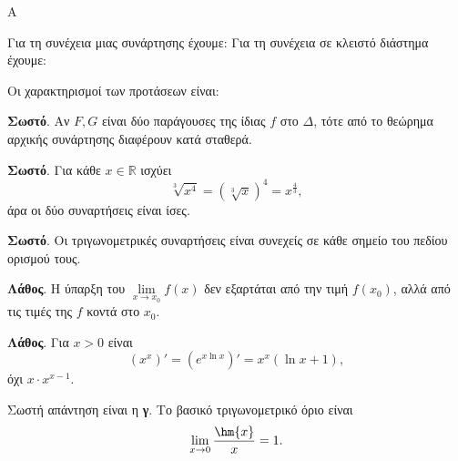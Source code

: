 \begin{thema}{Α}
\begin{erwthma}
\item {}

\item Για τη συνέχεια μιας συνάρτησης έχουμε:
Για τη συνέχεια σε κλειστό διάστημα έχουμε:

\item {}

\item Οι χαρακτηρισμοί των προτάσεων είναι:
\begin{alist}
\item \textbf{Σωστό}. Αν $F,G$ είναι δύο παράγουσες της ίδιας $f$ στο $\Delta$, τότε από το θεώρημα αρχικής συνάρτησης διαφέρουν κατά σταθερά.
\item \textbf{Σωστό}. Για κάθε $x\in\mathbb{R}$ ισχύει
\[ \sqrt[3]{x^4}=\left(\sqrt[3]{x}\right)^4=x^{\frac43}, \]
άρα οι δύο συναρτήσεις είναι ίσες.
\item \textbf{Σωστό}. Οι τριγωνομετρικές συναρτήσεις είναι συνεχείς σε κάθε σημείο του πεδίου ορισμού τους.
\item \textbf{Λάθος}. Η ύπαρξη του $\lim\limits_{x\to x_0}f(x)$ δεν εξαρτάται από την τιμή $f(x_0)$, αλλά από τις τιμές της $f$ κοντά στο $x_0$.
\item \textbf{Λάθος}. Για $x>0$ είναι
\[ (x^x)'=\left(e^{x\ln{x}}\right)'=x^x(\ln{x}+1), \]
όχι $x\cdot x^{x-1}$.
\end{alist}

\item Σωστή απάντηση είναι η \textbf{γ}. Το βασικό τριγωνομετρικό όριο είναι
\[ \lim_{x\to0}\dfrac{\hm{x}}{x}=1. \]
\end{erwthma}
\end{thema}

